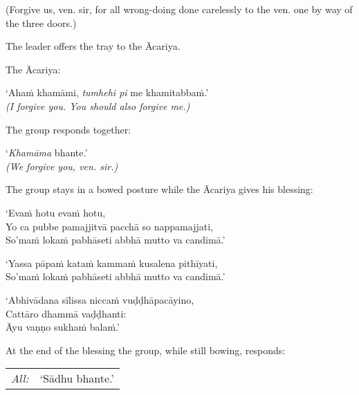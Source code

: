 \begin{english}
  (Forgive us, ven. sir, for all wrong-doing done carelessly to the ven. one by way of the three doors.)
\end{english}

The leader offers the tray to the Ācariya.

The Ācariya:

\vspace*{\parskip}

\begin{paritta}
  ‘Ahaṁ khamāmi, \emph{tumhehi pi} me khamitabbaṁ.’\\
  \emph{(I forgive you. You should also forgive me.)}
\end{paritta}

The group responds together:

\vspace*{\parskip}

\begin{paritta}
  ‘\emph{Khamāma} bhante.’\\
  \emph{(We forgive you, ven. sir.)}
\end{paritta}

The group stays in a bowed posture while the Ācariya gives his blessing:

\vspace*{\parskip}

\begin{paritta}
  ‘Evaṁ hotu evaṁ hotu,\\
  Yo ca pubbe pamajjitvā pacchā so nappamajjati,\\
  So'maṁ lokaṁ pabhāseti abbhā mutto va candimā.’

  ‘Yassa pāpaṁ kataṁ kammaṁ kusalena pithīyati,\\
  So'maṁ lokaṁ pabhāseti abbhā mutto va candimā.’

  ‘Abhivādana sīlissa niccaṁ vuḍḍhāpacāyino,\\
  Cattāro dhammā vaḍḍhanti:\\
  Āyu vaṇṇo sukhaṁ balaṁ.’

\end{paritta}

At the end of the blessing the group, while still bowing, responds:

\begin{tabular}{@{}L{3em}L{10em}@{}}
\hspace*{1.5em}\emph{All:} & ‘Sādhu bhante.’\\
\end{tabular}

